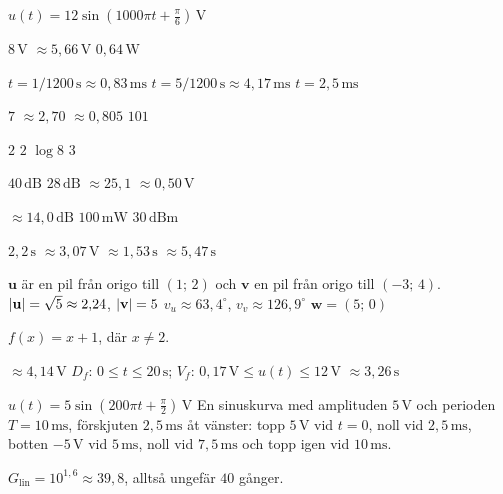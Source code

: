 \begin{facit}
 $u(t) = 12\sin\left(1000\pi t + \frac{\pi}{6}\right)\,\text{V}$

  $8\,\text{V}$  $\approx 5{,}66\,\text{V}$  $0{,}64\,\text{W}$

  $t = 1/1200\,\text{s} \approx 0{,}83\,\text{ms}$
 $t = 5/1200\,\text{s} \approx 4{,}17\,\text{ms}$  $t = 2{,}5\,\text{ms}$

  $7$  $\approx 2{,}70$  $\approx 0{,}805$  $101$

  $2$  $2$  $\log 8$  $3$

  $40\,\text{dB}$  $28\,\text{dB}$  $\approx 25{,}1$
 $\approx 0{,}50\,\text{V}$

  $\approx 14{,}0\,\text{dB}$  $100\,\text{mW}$  $30\,\text{dBm}$

  $2{,}2\,\text{s}$  $\approx 3{,}07\,\text{V}$
 $\approx 1{,}53\,\text{s}$  $\approx 5{,}47\,\text{s}$

\end{facit}

\begin{facit}

  $\mathbf{u}$ är en pil från origo till $(1;\,2)$ och $\mathbf{v}$ en pil från
origo till $(-3;\,4)$.
 $\lvert\mathbf{u}\rvert = \sqrt{5} \approx 2{,}24$, $\lvert\mathbf{v}\rvert = 5$
 $v_u \approx 63{,}4^{\circ}$, $v_v \approx 126{,}9^{\circ}$
 $\mathbf{w} = (5;\,0)$

 $f(x) = x + 1$, där $x \neq 2$.

  $\approx 4{,}14\,\text{V}$
 $D_f$: $0 \leq t \leq 20\,\text{s}$; $V_f$: $0{,}17\,\text{V} \leq u(t) \leq 12\,\text{V}$
 $\approx 3{,}26\,\text{s}$

  $u(t) = 5\sin\left(200\pi t + \frac{\pi}{2}\right)\,\text{V}$
 En sinuskurva med amplituden $5\,\text{V}$ och perioden $T = 10\,\text{ms}$, förskjuten
$2{,}5\,\text{ms}$ åt vänster: topp $5\,\text{V}$ vid $t = 0$, noll vid $2{,}5\,\text{ms}$, botten
$-5\,\text{V}$ vid $5\,\text{ms}$, noll vid $7{,}5\,\text{ms}$ och topp igen vid $10\,\text{ms}$.

 $G_{\text{lin}} = 10^{1{,}6} \approx 39{,}8$, alltså ungefär $40$ gånger.

\end{facit}
